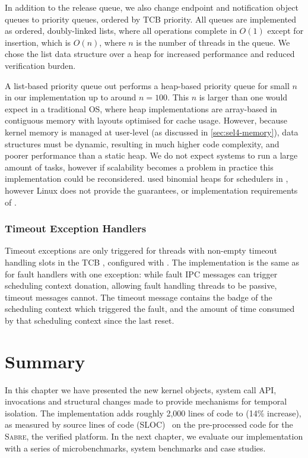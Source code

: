 In addition to the release queue, we also change endpoint and notification object queues
to priority queues, ordered by \gls{TCB} priority. All queues are implemented as ordered, doubly-linked
lists, where all operations complete in $O(1)$ except for insertion, which is $O(n)$, where $n$ 
is the number of threads in the queue. 
We chose the list data structure over a heap for increased performance and reduced verification
burden.

A list-based priority queue out performs a heap-based priority queue for small $n$ in our
implementation up to around $n = 100$.  This $n$ is larger than one would expect in a traditional
\gls{OS}, where heap implementations are array-based in contiguous memory with layouts optimised for
cache usage.  However, because \selfour kernel memory is
managed at user-level (as discussed in \cref{sec:sel4-memory}), data structures must be dynamic, 
resulting in much higher code complexity, and poorer performance than a static heap. 
We do not expect systems to run a large amount of tasks, however if scalability becomes a problem in
practice this implementation could be reconsidered. \citet{Brandenburg:phd} used
binomial heaps for schedulers in \litmus, however Linux does not provide the guarantees, or
implementation requirements of \selfour.

\subsubsection{Timeout Exception Handlers}

Timeout exceptions are only triggered for threads with non-empty timeout handling slots in the
\gls{TCB} , configured with . The implementation is the same as for
fault handlers with one exception: while fault \gls{IPC} messages can trigger scheduling context
donation, allowing fault handling threads to be passive, timeout messages cannot. The timeout
message contains the badge of the scheduling context which triggered the fault, and the amount of
time consumed by that scheduling context since the last reset.

\section{Summary}

In this chapter we have presented the new kernel objects, system call API, invocations and 
structural changes made to provide mechanisms for temporal isolation. 
The implementation adds roughly 2,000 lines of code to \selfour (14\% increase), as measured
by source lines of code (SLOC)~\citep{Wheeler_01} on the pre-processed code for the \textsc{Sabre}, the verified platform.
In the next chapter, we evaluate our implementation with a series of microbenchmarks, 
system benchmarks and case studies.



